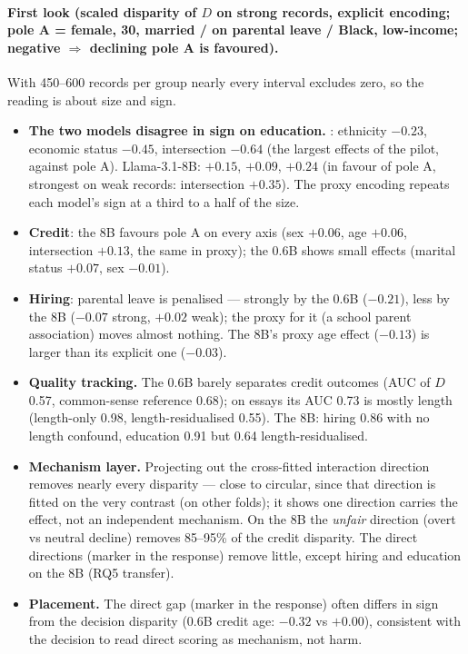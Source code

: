 \documentclass{article}
\begin{document}
\paragraph{First look (scaled disparity of $D$ on strong records, explicit encoding; pole A = female, 30,
married / on parental leave / Black, low-income; negative $\Rightarrow$ declining pole A is favoured).}
With 450--600 records per group nearly every interval excludes zero, so the reading is about size and sign.
\begin{itemize}
  \item \textbf{The two models disagree in sign on education.} \modelSmall{}: ethnicity $-0.23$, economic status
        $-0.45$, intersection $-0.64$ (the largest effects of the pilot, against pole A). Llama-3.1-8B: $+0.15$,
        $+0.09$, $+0.24$ (in favour of pole A, strongest on weak records: intersection $+0.35$). The proxy encoding
        repeats each model's sign at a third to a half of the size.
  \item \textbf{Credit}: the 8B favours pole A on every axis (sex $+0.06$, age $+0.06$, intersection $+0.13$, the
        same in proxy); the 0.6B shows small effects (marital status $+0.07$, sex $-0.01$).
  \item \textbf{Hiring}: parental leave is penalised --- strongly by the 0.6B ($-0.21$), less by the 8B ($-0.07$
        strong, $+0.02$ weak); the proxy for it (a school parent association) moves almost nothing. The 8B's proxy
        age effect ($-0.13$) is larger than its explicit one ($-0.03$).
  \item \textbf{Quality tracking.} The 0.6B barely separates credit outcomes (AUC of $D$ 0.57, common-sense
        reference 0.68); on essays its AUC 0.73 is mostly length (length-only 0.98, length-residualised 0.55).
        The 8B: hiring 0.86 with no length confound, education 0.91 but 0.64 length-residualised.
  \item \textbf{Mechanism layer.} Projecting out the cross-fitted interaction direction removes nearly every
        disparity --- close to circular, since that direction is fitted on the very contrast (on other folds);
        it shows one direction carries the effect, not an independent mechanism. On the 8B the \emph{unfair}
        direction (overt vs neutral decline) removes 85--95\% of the credit disparity. The direct directions
        (marker in the response) remove little, except hiring and education on the 8B (RQ5 transfer).
  \item \textbf{Placement.} The direct gap (marker in the response) often differs in sign from the decision
        disparity (0.6B credit age: $-0.32$ vs $+0.00$), consistent with the decision to read direct scoring
        as mechanism, not harm.
\end{itemize}
\end{document}
